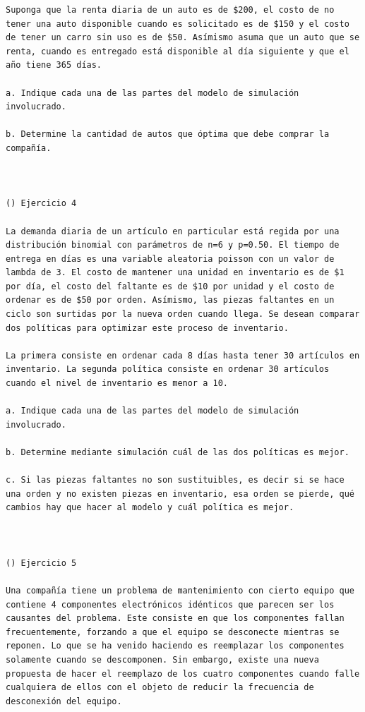 \begin{verbatim}
Suponga que la renta diaria de un auto es de $200, el costo de no tener una auto disponible cuando es solicitado es de $150 y el costo de tener un carro sin uso es de $50. Asímismo asuma que un auto que se renta, cuando es entregado está disponible al día siguiente y que el año tiene 365 días.

a. Indique cada una de las partes del modelo de simulación involucrado.

b. Determine la cantidad de autos que óptima que debe comprar la compañía.



() Ejercicio 4

La demanda diaria de un artículo en particular está regida por una distribución binomial con parámetros de n=6 y p=0.50. El tiempo de entrega en días es una variable aleatoria poisson con un valor de lambda de 3. El costo de mantener una unidad en inventario es de $1 por día, el costo del faltante es de $10 por unidad y el costo de ordenar es de $50 por orden. Asímismo, las piezas faltantes en un ciclo son surtidas por la nueva orden cuando llega. Se desean comparar dos políticas para optimizar este proceso de inventario.

La primera consiste en ordenar cada 8 días hasta tener 30 artículos en inventario. La segunda política consiste en ordenar 30 artículos cuando el nivel de inventario es menor a 10. 

a. Indique cada una de las partes del modelo de simulación involucrado.

b. Determine mediante simulación cuál de las dos políticas es mejor.

c. Si las piezas faltantes no son sustituibles, es decir si se hace una orden y no existen piezas en inventario, esa orden se pierde, qué cambios hay que hacer al modelo y cuál política es mejor.



() Ejercicio 5

Una compañía tiene un problema de mantenimiento con cierto equipo que contiene 4 componentes electrónicos idénticos que parecen ser los causantes del problema. Este consiste en que los componentes fallan frecuentemente, forzando a que el equipo se desconecte mientras se reponen. Lo que se ha venido haciendo es reemplazar los componentes solamente cuando se descomponen. Sin embargo, existe una nueva propuesta de hacer el reemplazo de los cuatro componentes cuando falle cualquiera de ellos con el objeto de reducir la frecuencia de desconexión del equipo.


\end{verbatim}
